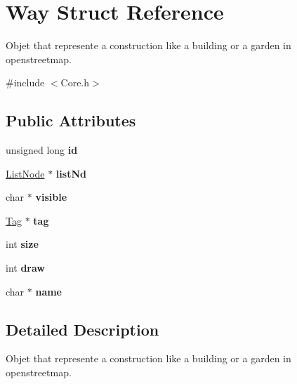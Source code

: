 \hypertarget{structWay}{\section{Way Struct Reference}
\label{structWay}
}


Objet that represente a construction like a building or a garden in openstreetmap.  




{\ttfamily \#include $<$Core.\-h$>$}

\subsection*{Public Attributes}
\begin{DoxyCompactItemize}
\item 
\hypertarget{structWay_a1cca095d0625e82d6bfb36dd1d46640f}{unsigned long {\bfseries id}}\label{structWay_a1cca095d0625e82d6bfb36dd1d46640f}

\item 
\hypertarget{structWay_acac0fa32ab84a83dd2797fb255a4fe1a}{\hyperlink{structListNode}{List\-Node} $\ast$ {\bfseries list\-Nd}}\label{structWay_acac0fa32ab84a83dd2797fb255a4fe1a}

\item 
\hypertarget{structWay_a1eb964f25274018f981f08292cb221bb}{char $\ast$ {\bfseries visible}}\label{structWay_a1eb964f25274018f981f08292cb221bb}

\item 
\hypertarget{structWay_a0941af436e8c52be813a29f02f0eb987}{\hyperlink{structTag}{Tag} $\ast$ {\bfseries tag}}\label{structWay_a0941af436e8c52be813a29f02f0eb987}

\item 
\hypertarget{structWay_a51e8d4755a7e591657d7e70f34984af0}{int {\bfseries size}}\label{structWay_a51e8d4755a7e591657d7e70f34984af0}

\item 
\hypertarget{structWay_a9bbbf5fb49a0c87e2672dad52d845839}{int {\bfseries draw}}\label{structWay_a9bbbf5fb49a0c87e2672dad52d845839}

\item 
\hypertarget{structWay_adedae7524ea19d540ad71fa905729697}{char $\ast$ {\bfseries name}}\label{structWay_adedae7524ea19d540ad71fa905729697}

\end{DoxyCompactItemize}


\subsection{Detailed Description}
Objet that represente a construction like a building or a garden in openstreetmap. 

